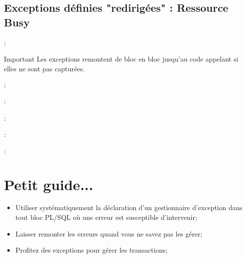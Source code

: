 \documentclass[10pt]{beamer}
\begin{document}
\subsection{Exceptions définies "redirigées" : Ressource Busy}
\begin{frame}{\secname : \subsecname}
    \begin{alertblock}{Important}
        Les exceptions remontent de bloc en bloc jusqu'au code appelant si elles ne sont pas capturées.
    \end{alertblock}
\end{frame}

\begin{frame}{\secname : \subsecname}
    
\end{frame}

\begin{frame}{\secname : \subsecname}
    
\end{frame}

\begin{frame}{\secname : \subsecname}
    
\end{frame}

\begin{frame}{\secname : \subsecname}
    
\end{frame}

\begin{frame}{\secname : \subsecname}
    
\end{frame}

\section{Petit guide...}
\begin{frame}{\secname}
    \begin{itemize}
        \item Utiliser systématiquement la déclaration d'un gestionnaire d'exception dans tout bloc PL/SQL où une erreur est susceptible d'intervenir;
        \item Laisser remonter les erreurs quand vous ne savez pas les gérer;
        \item Profitez des exceptions pour gérer les transactions;
    \end{itemize}
\end{frame}
\end{document}
